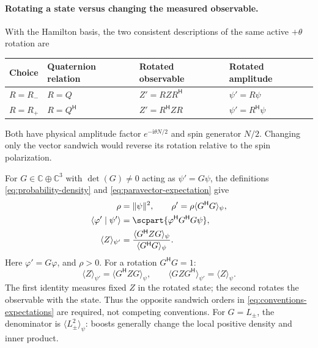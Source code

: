 \documentclass[11pt]{article}
\newcommand{\pv}[1]{{#1}}
\newcommand{\pvGreek}[1]{{#1}}
\newcommand{\pG}{\pv{G}}
\newcommand{\pL}{\pv{L}}
\newcommand{\pN}{\pv{N}}
\newcommand{\pQ}{\pv{Q}}
\newcommand{\pR}{\pv{R}}
\newcommand{\pZ}{\pv{Z}}
\newcommand{\pvpsi}{\pvGreek{\psi}}
\newcommand{\pvvarphi}{\pvGreek{\varphi}}
\numberwithin{equation}{section}
\newcommand{\C}{\mathbb{C}}
\newcommand{\ii}{\mathrm{i}}
\begin{document}
\paragraph{Rotating a state versus changing the measured observable.}
With the Hamilton basis, the two consistent descriptions of the same
active $+\theta$ rotation are
\begin{center}
\begin{tabular}{@{}llll@{}}
\toprule
Choice & Quaternion relation & Rotated observable & Rotated amplitude\\
\midrule
$\pR=\pR_-$ & $\pR=\pQ$ & $\pZ'=\pR \pZ \pR^{\mathsf H}$ & $\pvpsi'=\pR\pvpsi$\\
$\pR=\pR_+$ & $\pR=\pQ^{\mathsf H}$ & $\pZ'=\pR^{\mathsf H}\pZ \pR$ & $\pvpsi'=\pR^{\mathsf H}\pvpsi$\\
\bottomrule
\end{tabular}
\end{center}
Both have physical amplitude factor
$e^{-\ii\theta \pN/2}$ and spin generator $\pN/2$.
Changing only the vector sandwich would reverse its rotation relative to
the spin polarization.

For $\pG\in\C\oplus\C^3$ with $\det(\pG)\ne0$ acting as $\pvpsi'=\pG\pvpsi$, the definitions
\eqref{eq:probability-density} and \eqref{eq:paravector-expectation} give
\begin{align*}
 \rho&=\lVert\pvpsi\rVert^2,\qquad
 \rho'=\rho\langle \pG^{\mathsf H}\pG\rangle_\pvpsi,\\
 \langle\pvvarphi'\mid\pvpsi'\rangle
 &=\scpart{\pvvarphi^{\mathsf H}\pG^{\mathsf H}\pG\pvpsi},\\
 \langle \pZ\rangle_{\pvpsi'}
 &=\frac{\langle \pG^{\mathsf H}\pZ \pG\rangle_\pvpsi}
         {\langle \pG^{\mathsf H}\pG\rangle_\pvpsi}.
\end{align*}
Here $\pvvarphi'=\pG\pvvarphi$, and $\rho>0$.  For a rotation $\pG^{\mathsf H}\pG=1$:
\begin{equation}
 \boxed{\langle \pZ\rangle_{\pvpsi'}=\langle \pG^{\mathsf H}\pZ \pG\rangle_\pvpsi,
 \qquad
 \langle \pG \pZ \pG^{\mathsf H}\rangle_{\pvpsi'}=\langle \pZ\rangle_\pvpsi.}
 \label{eq:conventions-expectations}
\end{equation}
The first identity measures fixed $\pZ$ in the rotated state; the second
rotates the observable with the state.  Thus the opposite sandwich orders
in \eqref{eq:conventions-expectations} are required, not competing conventions.
For $\pG=\pL_\pm$, the denominator is $\langle \pL_\pm^2\rangle_\pvpsi$:
boosts generally change the local positive density and inner product.
\end{document}
